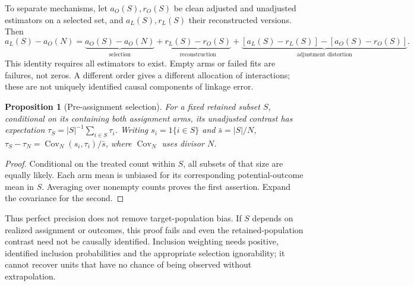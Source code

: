 \documentclass[11pt]{article}
\newtheorem{proposition}{Proposition}
\newcommand{\Cov}{\operatorname{Cov}}
\begin{document}
To separate mechanisms, let $a_O(S),r_O(S)$ be clean adjusted and unadjusted estimators
on a selected set, and $a_L(S),r_L(S)$ their reconstructed versions. Then
\[
 a_L(S)-a_O(N)=\underbrace{a_O(S)-a_O(N)}_{\text{selection}}
 +\underbrace{r_L(S)-r_O(S)}_{\text{reconstruction}}
 +\underbrace{[a_L(S)-r_L(S)]-[a_O(S)-r_O(S)]}_{\text{adjustment distortion}}.
\]
This identity requires all estimators to exist. Empty arms or failed fits are failures,
not zeros. A different order gives a different allocation of interactions; these are
not uniquely identified causal components of linkage error.

\begin{proposition}[Pre-assignment selection]
For a fixed retained subset $S$, conditional on its containing both assignment arms,
its unadjusted contrast has expectation $\tau_S=|S|^{-1}\sum_{i\in S}\tau_i$.
Writing $s_i=1\{i\in S\}$ and $\bar s=|S|/N$,
$\tau_S-\tau_N=\Cov_N(s_i,\tau_i)/\bar s$, where $\Cov_N$ uses divisor $N$.
\end{proposition}
\begin{proof}
Conditional on the treated count within $S$, all subsets of that size are equally
likely. Each arm mean is unbiased for its corresponding potential-outcome mean in
$S$. Averaging over nonempty counts proves the first assertion. Expand the covariance
for the second.
\end{proof}
Thus perfect precision does not remove target-population bias. If $S$ depends on realized
assignment or outcomes, this proof fails and even the retained-population contrast
need not be causally identified. Inclusion weighting needs positive, identified
inclusion probabilities and the appropriate selection ignorability; it cannot recover
units that have no chance of being observed without extrapolation.
\end{document}
